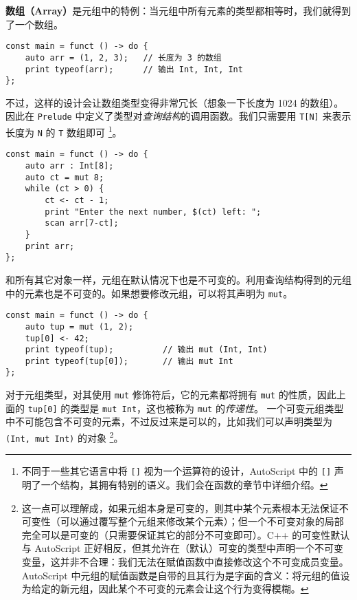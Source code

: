 \textbf{数组（Array）}是元组中的特例：当元组中所有元素的类型都相等时，我们就得到了一个数组。

\begin{lstlisting}
const main = funct () -> do {
    auto arr = (1, 2, 3);   // 长度为 3 的数组
    print typeof(arr);      // 输出 Int, Int, Int
};
\end{lstlisting}

不过，这样的设计会让数组类型变得非常冗长（想象一下长度为 1024 的数组）。因此在 \lstinline!Prelude! 中定义了类型对\emph{查询结构}的调用函数。我们只需要用 \lstinline!T[N]! 来表示长度为 \lstinline!N! 的 \lstinline!T! 数组即可 \footnote{不同于一些其它语言中将 \lstinline![]! 视为一个运算符的设计，AutoScript 中的 \lstinline![]! 声明了一个结构，其拥有特别的语义。我们会在函数的章节中详细介绍。}。

\begin{lstlisting}
const main = funct () -> do {
    auto arr : Int[8];
    auto ct = mut 8;
    while (ct > 0) {
        ct <- ct - 1;
        print "Enter the next number, $(ct) left: ";
        scan arr[7-ct];
    }
    print arr;
};
\end{lstlisting}

和所有其它对象一样，元组在默认情况下也是不可变的。利用查询结构得到的元组中的元素也是不可变的。如果想要修改元组，可以将其声明为 \lstinline!mut!。

\begin{lstlisting}
const main = funct () -> do {
	auto tup = mut (1, 2);
	tup[0] <- 42;
	print typeof(tup);			// 输出 mut (Int, Int)
	print typeof(tup[0]);		// 输出 mut Int
};
\end{lstlisting}

对于元组类型，对其使用 \lstinline!mut! 修饰符后，它的元素都将拥有 \lstinline!mut! 的性质，因此上面的 \lstinline!tup[0]! 的类型是 \lstinline!mut Int!，这也被称为 \lstinline!mut! 的\emph{传递性}。 一个可变元组类型中不可能包含不可变的元素，不过反过来是可以的，比如我们可以声明类型为 \lstinline!(Int, mut Int)! 的对象 \footnote{这一点可以理解成，如果元组本身是可变的，则其中某个元素根本无法保证不可变性（可以通过覆写整个元组来修改某个元素）；但一个不可变对象的局部完全可以是可变的（只需要保证其它的部分不可变即可）。C++ 的可变性默认与 AutoScript 正好相反，但其允许在（默认）可变的类型中声明一个不可变变量，这并非不合理：我们无法在赋值函数中直接修改这个不可变成员变量。AutoScript 中元组的赋值函数是自带的且其行为是字面的含义：将元组的值设为给定的新元组，因此某个不可变的元素会让这个行为变得模糊。}。 \\

